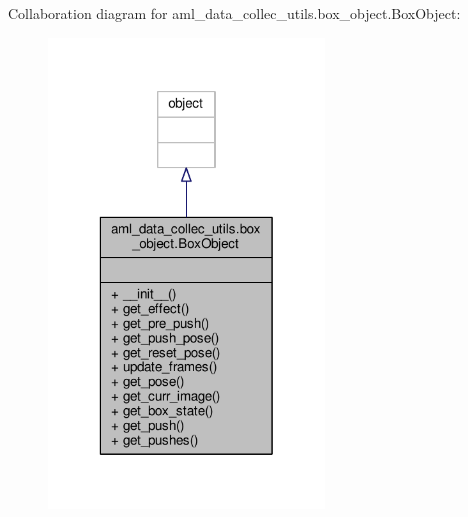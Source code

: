 Collaboration diagram for aml\-\_\-data\-\_\-collec\-\_\-utils.\-box\-\_\-object.\-Box\-Object\-:\nopagebreak
\begin{figure}[H]
\begin{center}
\leavevmode
\includegraphics[width=208pt]{classaml__data__collec__utils_1_1box__object_1_1_box_object__coll__graph}
\end{center}
\end{figure}
